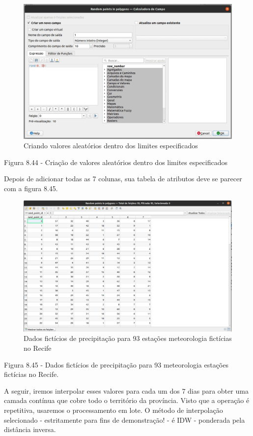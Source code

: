 \documentclass[
]{krantz}
\begin{document}
\begin{figure}
\centering
\includegraphics{media/modulo8/fig844.png}
\caption{Criando valores aleatórios dentro dos limites especificados}
\end{figure}

Figura 8.44 - Criação de valores aleatórios dentro dos limites especificados

Depois de adicionar todas as 7 colunas, sua tabela de atributos deve se parecer com a figura 8.45.

\begin{figure}
\centering
\includegraphics{media/modulo8/fig845.png}
\caption{Dados fictícios de precipitação para 93 estações meteorologia fictícias no Recife}
\end{figure}

Figura 8.45 - Dados fictícios de precipitação para 93 meteorologia estações fictícias no Recife.

A seguir, iremos interpolar esses valores para cada um dos 7 dias para obter uma camada contínua que cobre todo o território da província. Visto que a operação é repetitiva, usaremos o processamento em lote. O método de interpolação selecionado - estritamente para fins de demonstração! - é IDW - ponderada pela distância inversa.
\end{document}
